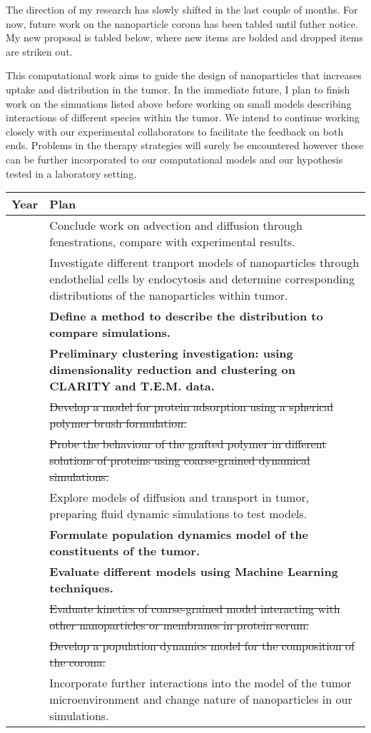 The direction of my research has slowly shifted in the last couple of months. For now, future work on the nanoparticle corona has been tabled until futher notice. My new proposal is tabled below, where new items are bolded and dropped items are striken out.

This computational work aims to guide the design of nanoparticles that increases uptake and distribution in the tumor. 
In the immediate future, I plan to finish work on the simuations listed above before working on small models describing interactions of different species within the tumor.
We intend to  continue working closely with our experimental collaborators to facilitate the feedback on both ends.
Problems in the therapy strategies will surely be encountered however these can be further incorporated to our computational models and our hypothesis tested in a laboratory setting.

\begin{center}
\begin{tabular}{ |p{1.5cm}||p{14cm}|  }
 \hline
 \centering Year & Plan\\
 \hline
 \centering 1   & Conclude work on advection and diffusion through fenestrations, compare with experimental results.\\
                & Investigate different tranport models of nanoparticles through endothelial cells by endocytosis and determine corresponding distributions of the nanoparticles within tumor.\\
                & \textbf{ Define a method to describe the distribution to compare simulations. }\\
                & \textbf{ Preliminary clustering investigation: using dimensionality reduction and clustering on CLARITY and T.E.M. data.}\\
                & \st{Develop a model for protein adsorption using a spherical polymer brush formulation.}\\
 \centering 2   & \st{Probe the behaviour of the grafted polymer in different solutions of proteins using coarse-grained dynamical simulations.}\\
                & Explore models of diffusion and transport in tumor, preparing fluid dynamic simulations to test models. \\
                & \textbf{ Formulate population dynamics model of the constituents of the tumor.}\\
                & \textbf{ Evaluate different models using Machine Learning techniques. }\\
 \centering 3   & \st{Evaluate kinetics of coarse-grained model interacting with other nanoparticles or membranes in protein serum.}\\
                & \st{Develop a population dynamics model for the composition of the corona.}\\
                & Incorporate further interactions into the model of the tumor microenvironment and change nature of nanoparticles in our simulations.\\

 \hline
\end{tabular}
\end{center}
